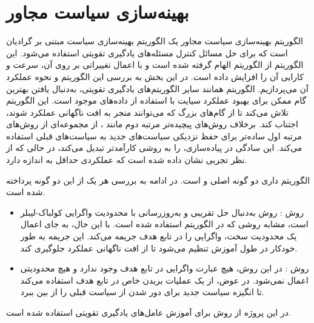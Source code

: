 \section{بهینه‌سازی سیاست مجاور}
الگوریتم 
بهینه‌سازی سیاست مجاور
 یک الگوریتم بهینه‌سازی سیاست مبتنی بر گرادیان است که برای حل مسائل کنترل مسئله‌های یادگیری تقویتی استفاده می‌شود. این الگوریتم از الگوریتم 
 الهام گرفته شده است و با اعمال تغییراتی بر روی آن، سرعت و کارایی آن را افزایش داده است. در این بخش به بررسی این الگوریتم و نحوه عملکرد آن می‌پردازیم.
 الگوریتم  همانند سایر الگوریتم‌های یادگیری تقویتی، به‌دنبال یافتن بهترین گام ممکن برای بهبود عملکرد سیایت با استفاده از داده‌های موجود است. این الگوریتم تلاش می‌کند تا از گام‌های بزرگ که می‌توانند منجر به افت ناگهانی عملکرد شوند، اجتناب کند.
 برخلاف روش‌های پیچیده‌تر مرتبه دوم مانند 
 ، 
  از مجموعه‌ای از روش‌های مرتبه اول ساده‌تر برای حفظ نزدیکی سیاست‌های جدید به سیاست‌های قبلی استفاده می‌کند. این سادگی در پیاده‌سازی،  را به روشی کارآمدتر تبدیل می‌کند، در حالی که از نظر تجربی نشان داده شده است که عملکردی حداقل به اندازه  دارد.

  الگوریتم
  داری دو گونه اصلی 
    و
    است. در ادامه به بررسی هر یک از این دو گونه پرداخته شده است.
    \begin{itemize}
        \item روش
         :
        روش
         به‌دنبال حل تقریبی و به‌روز‌رسانی با 
        محدودیت واگرایی کولباک-لیبلر
است، مشابه روشی که در الگوریتم  استفاده شده است.
 با این حال، به جای اعمال یک محدودیت سخت،
  واگرایی  را در تابع هدف جریمه می‌کند. این جریمه به طور خودکار در طول آموزش تنظیم می‌شود تا از افت ناگهانی عملکرد جلوگیری کند.
    \item روش
    :
    در این روش، هیچ عبارت واگرایی  در تابع هدف وجود ندارد و هیچ محدودیتی اعمال نمی‌شود. در عوض،
     از یک عملیات بریدن خاص در تابع هدف استفاده می‌کند تا انگیزه سیاست جدید برای دور شدن از سیاست قبلی را از بین ببرد.    
    \end{itemize}
    در این پروژه از روش 
    برای آموزش عامل‌های یادگیری تقویتی استفاده شده است.
    